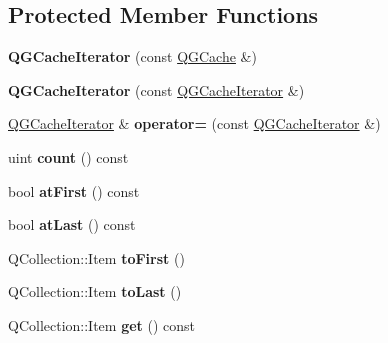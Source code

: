\subsection*{Protected Member Functions}
\begin{DoxyCompactItemize}
\item 
\mbox{\label{class_q_g_cache_iterator_afc9bb849ad168bddde02db9807309bda}} 
{\bfseries Q\+G\+Cache\+Iterator} (const \mbox{\hyperlink{class_q_g_cache}{Q\+G\+Cache}} \&)
\item 
\mbox{\label{class_q_g_cache_iterator_ab05bed43b4aa7b87e0719539bb465f82}} 
{\bfseries Q\+G\+Cache\+Iterator} (const \mbox{\hyperlink{class_q_g_cache_iterator}{Q\+G\+Cache\+Iterator}} \&)
\item 
\mbox{\label{class_q_g_cache_iterator_a89d2f501aee1742a97759c96bf3145e5}} 
\mbox{\hyperlink{class_q_g_cache_iterator}{Q\+G\+Cache\+Iterator}} \& {\bfseries operator=} (const \mbox{\hyperlink{class_q_g_cache_iterator}{Q\+G\+Cache\+Iterator}} \&)
\item 
\mbox{\label{class_q_g_cache_iterator_a3544036f6640db6b79a1c112ad1df053}} 
uint {\bfseries count} () const
\item 
\mbox{\label{class_q_g_cache_iterator_afe22cb9a30c6d47bbddeae6ba667e5de}} 
bool {\bfseries at\+First} () const
\item 
\mbox{\label{class_q_g_cache_iterator_a491d9b80a76093d0e9e42625012d5004}} 
bool {\bfseries at\+Last} () const
\item 
\mbox{\label{class_q_g_cache_iterator_a9ae73b4d131832f6682352038810797e}} 
Q\+Collection\+::\+Item {\bfseries to\+First} ()
\item 
\mbox{\label{class_q_g_cache_iterator_af6c9216f68a2422b468e05911dfdbbf1}} 
Q\+Collection\+::\+Item {\bfseries to\+Last} ()
\item 
\mbox{\label{class_q_g_cache_iterator_a86e9dba6b1cbfc1296447da53fb8f11a}} 
Q\+Collection\+::\+Item {\bfseries get} () const

\end{DoxyCompactItemize}
